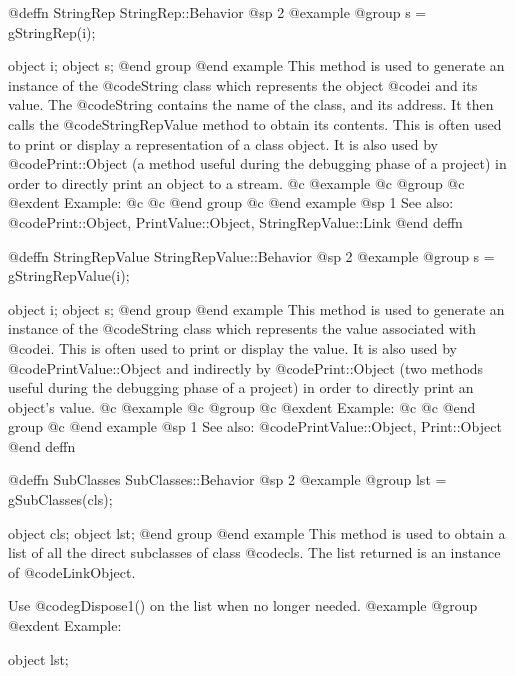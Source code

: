 @deffn {StringRep} StringRep::Behavior
@sp 2
@example
@group
s = gStringRep(i);

object  i;
object  s;
@end group
@end example
This method is used to generate an instance of the @code{String} class
which represents the object @code{i} and its value.  The @code{String}
contains the name of the class, and its address.  It then calls the
@code{StringRepValue} method to obtain its contents.  This is often used
to print or display a representation of a class object.  It is also used
by @code{Print::Object} (a method useful during the debugging phase
of a project) in order to directly print an object to a stream.
@c @example
@c @group
@c @exdent Example:
@c 
@c @end group
@c @end example
@sp 1
See also:  @code{Print::Object, PrintValue::Object, StringRepValue::Link}
@end deffn
















@deffn {StringRepValue} StringRepValue::Behavior
@sp 2
@example
@group
s = gStringRepValue(i);

object  i;
object  s;
@end group
@end example
This method is used to generate an instance of the @code{String} class
which represents the value associated with @code{i}.  This is often
used to print or display the value.  It is also used by
@code{PrintValue::Object} and indirectly by @code{Print::Object}
(two methods useful during the debugging phase of a project)
in order to directly print an object's value.
@c @example
@c @group
@c @exdent Example:
@c 
@c @end group
@c @end example
@sp 1
See also:  @code{PrintValue::Object, Print::Object}
@end deffn










@deffn {SubClasses} SubClasses::Behavior
@sp 2
@example
@group
lst = gSubClasses(cls);

object  cls;
object  lst;
@end group
@end example
This method is used to obtain a list of all the direct subclasses of
class @code{cls}.  The list returned is an instance of
@code{LinkObject}.

Use @code{gDispose1()} on the list when no longer needed.
@example
@group
@exdent Example:

object  lst;

